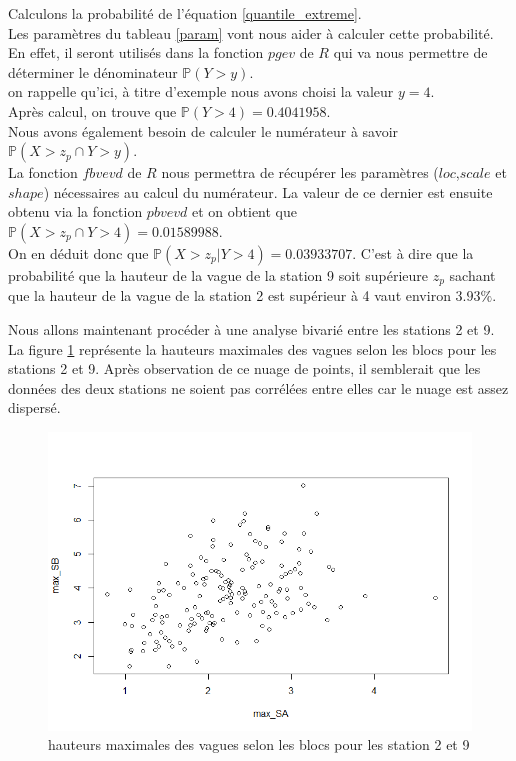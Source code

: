 \documentclass[a4paper,french,10pt]{article}
\begin{document}
Calculons la probabilité de l'équation \ref{quantile_extreme}. \\
Les paramètres du tableau \ref{param} vont nous aider à calculer cette probabilité. En effet, il seront utilisés dans la fonction $pgev$ de $R$ qui va nous permettre de déterminer le dénominateur $\mathbb{P}(Y > y)$.\\
on rappelle qu'ici, à titre d'exemple nous avons choisi la valeur $y = 4$. \\
Après calcul, on trouve que $\mathbb{P}(Y > 4)=0.4041958$. \\
Nous avons également besoin de calculer le numérateur à savoir $\mathbb{P}(X > z_p \cap Y > y)$. \\
La fonction $fbvevd$ de $R$ nous permettra de récupérer les paramètres ($loc$,$scale$ et $shape$) nécessaires au calcul du numérateur. La valeur de ce dernier est ensuite obtenu via la fonction $pbvevd$ et on obtient que $\mathbb{P}(X > z_p \cap Y > 4) = 0.01589988$.\\
On en déduit donc que $\mathbb{P}(X > z_p | Y > 4) = 0.03933707$. C'est à dire que la probabilité que la hauteur de la vague de la station 9 soit supérieure $z_p$ sachant que la hauteur de la vague de la station 2 est supérieur à 4 vaut environ $3.93\%$.

\vspace{4mm}

Nous allons maintenant procéder à une analyse bivarié entre les stations 2 et 9. La figure \ref{double_max} représente la hauteurs maximales des vagues selon les blocs pour les stations 2 et 9. Après observation de ce nuage de points, il semblerait que les données des deux stations ne soient pas corrélées entre elles car le nuage est assez dispersé. 

\begin{figure}[htp] 
	\centering
	\includegraphics[scale=0.45]{images/double_max.png}
	\caption{hauteurs maximales des vagues selon les blocs pour les station 2 et 9}
	\label{double_max}
\end{figure}
\end{document}
